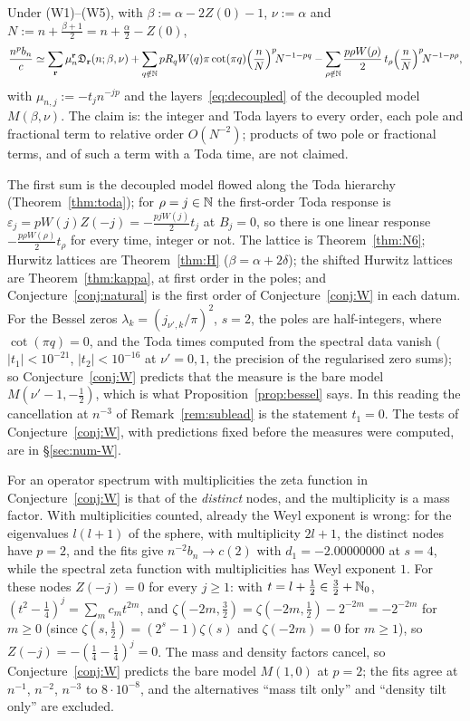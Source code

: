 \begin{conjecture}\label{conj:W}
Under (W1)--(W5), with $\beta:=\alpha-2Z(0)-1$, $\nu:=\alpha$ and $N:=n+\frac{\beta+1}2=n+\frac\alpha2-Z(0)$,
\[
  \frac{n^pb_n}c\simeq\sum_{\mathbf r}\mu_n^{\mathbf r}\mathfrak D_{\mathbf r}(n;\beta,\nu)
  +\sum_{q\notin\mathbb{N}}pR_qW(q)\pi\cot(\pi q)\Bigl(\frac nN\Bigr)^p\!N^{-1-pq}
  -\sum_{\rho\notin\mathbb{N}}\frac{p\rho W(\rho)}2\,t_\rho\Bigl(\frac nN\Bigr)^p\!N^{-1-p\rho},
\]
with $\mu_{n,j}:=-t_jn^{-jp}$ and the layers~\eqref{eq:decoupled} of the decoupled model $M(\beta,\nu)$. The claim is: the integer and Toda
layers to every order, each pole and fractional term to relative order $O(N^{-2})$; products of two pole or fractional terms, and of
such a term with a Toda time, are not claimed.
\end{conjecture}

The first sum is the decoupled model flowed along the Toda hierarchy (Theorem~\ref{thm:toda}); for $\rho=j\in\mathbb{N}$ the first-order
Toda response is $\varepsilon_j=pW(j)Z(-j)=-\frac{pjW(j)}2t_j$ at $B_j=0$, so there is one linear response $-\frac{p\rho W(\rho)}2t_\rho$ for
every time, integer or not. The lattice is Theorem~\ref{thm:N6}; Hurwitz lattices are Theorem~\ref{thm:H} ($\beta=\alpha+2\delta$);
the shifted Hurwitz lattices are Theorem~\ref{thm:kappa}, at first order in the poles; and Conjecture~\ref{conj:natural} is the first
order of Conjecture~\ref{conj:W} in each datum. For the Bessel zeros $\lambda_k=(j_{\nu',k}/\pi)^2$, $s=2$, the poles are half-integers,
where $\cot(\pi q)=0$, and the Toda times computed from the spectral data vanish ($|t_1|<10^{-21}$, $|t_2|<10^{-16}$ at $\nu'=0,1$, the
precision of the regularised zero sums); so Conjecture~\ref{conj:W} predicts that the measure is the bare model $M(\nu'-1,-\frac12)$,
which is what Proposition~\ref{prop:bessel} says. In this reading the cancellation at $n^{-3}$ of Remark~\ref{rem:sublead} is the
statement $t_1=0$. The tests of Conjecture~\ref{conj:W}, with predictions fixed before the measures were computed, are in
\S\ref{sec:num-W}.

\begin{remark}[multiplicities]\label{rem:mult}
For an operator spectrum with multiplicities the zeta function in Conjecture~\ref{conj:W} is that of the \emph{distinct} nodes, and the
multiplicity is a mass factor. With multiplicities counted, already the Weyl exponent is wrong: for the eigenvalues $l(l+1)$ of the
sphere, with multiplicity $2l+1$, the distinct nodes have $p=2$, and the fits give $n^{-2}b_n\to c(2)$ with $d_1=-2.00000000$ at $s=4$,
while the spectral zeta function with multiplicities has Weyl exponent $1$. For these nodes $Z(-j)=0$ for every $j\ge1$: with
$t=l+\frac12\in\frac32+\mathbb{N}_0$, $(t^2-\frac14)^j=\sum_mc_mt^{2m}$, and $\zeta(-2m,\frac32)=\zeta(-2m,\frac12)-2^{-2m}=-2^{-2m}$ for $m\ge0$
(since $\zeta(s,\frac12)=(2^s-1)\zeta(s)$ and $\zeta(-2m)=0$ for $m\ge1$), so $Z(-j)=-(\frac14-\frac14)^j=0$. The mass and density factors
cancel, so Conjecture~\ref{conj:W} predicts the bare model $M(1,0)$ at $p=2$; the fits agree at $n^{-1}$, $n^{-2}$, $n^{-3}$ to
$8\cdot10^{-8}$, and the alternatives ``mass tilt only'' and ``density tilt only'' are excluded.
\end{remark}

